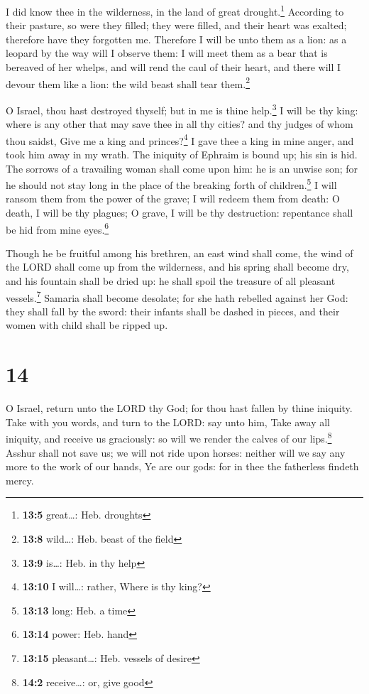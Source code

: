  I did know thee in the wilderness, in the land of great
drought.\footnote{\textbf{13:5} great\ldots: Heb. droughts}
 According to their pasture, so were they filled; they
were filled, and their heart was exalted; therefore have they forgotten
me.  Therefore I will be unto them as a lion: as a leopard
by the way will I observe them:  I will meet them as a
bear that is bereaved of her whelps, and will rend the caul of their
heart, and there will I devour them like a lion: the wild beast shall
tear them.\footnote{\textbf{13:8} wild\ldots: Heb. beast of the field}

 O Israel, thou hast destroyed thyself; but in me is thine
help.\footnote{\textbf{13:9} is\ldots: Heb. in thy help} 
I will be thy king: where is any other that may save thee in all thy
cities? and thy judges of whom thou saidst, Give me a king and
princes?\footnote{\textbf{13:10} I will\ldots: rather, Where is thy
  king?}  I gave thee a king in mine anger, and took him
away in my wrath.  The iniquity of Ephraim is bound up;
his sin is hid.  The sorrows of a travailing woman shall
come upon him: he is an unwise son; for he should not stay long in the
place of the breaking forth of children.\footnote{\textbf{13:13} long:
  Heb. a time}  I will ransom them from the power of the
grave; I will redeem them from death: O death, I will be thy plagues; O
grave, I will be thy destruction: repentance shall be hid from mine
eyes.\footnote{\textbf{13:14} power: Heb. hand}

 Though he be fruitful among his brethren, an east wind
shall come, the wind of the LORD shall come up from the wilderness, and
his spring shall become dry, and his fountain shall be dried up: he
shall spoil the treasure of all pleasant vessels.\footnote{\textbf{13:15}
  pleasant\ldots: Heb. vessels of desire}  Samaria shall
become desolate; for she hath rebelled against her God: they shall fall
by the sword: their infants shall be dashed in pieces, and their women
with child shall be ripped up.

\hypertarget{section-13}{%
\section{14}\label{section-13}}

 O Israel, return unto the LORD thy God; for thou hast
fallen by thine iniquity.  Take with you words, and turn
to the LORD: say unto him, Take away all iniquity, and receive us
graciously: so will we render the calves of our lips.\footnote{\textbf{14:2}
  receive\ldots: or, give good}  Asshur shall not save us;
we will not ride upon horses: neither will we say any more to the work
of our hands, Ye are our gods: for in thee the fatherless findeth mercy.

